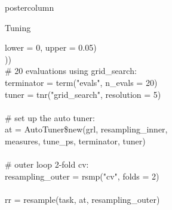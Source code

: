 \documentclass{beamer}
\begin{document}
\begin{frame}[fragile]{}
\begin{columns}
\begin{column}{.245\textwidth}
\begin{beamercolorbox}[center]{postercolumn}
\begin{minipage}{.98\textwidth}
{\begin{myblock}{Tuning}
\begin{codeboxexample}
{                \hspace*{2ex} lower = 0, upper = 0.05)\\
                ))\\
                \# 20 evaluations using grid\_search:\\
                terminator = term("evals", n\_evals = 20)\\
                tuner = tnr("grid\_search", resolution = 5)\\
                \ \\
                \# set up the auto tuner:\\
                at = AutoTuner\$new(grl, resampling\_inner,\\
                \hspace*{1ex} measures, tune\_ps, terminator, tuner)\\
                \ \\
                \# outer loop 2-fold cv:\\
                resampling\_outer = rsmp("cv", folds = 2)\\
                \ \\
                rr = resample(task, at, resampling\_outer)}
					    \end{codeboxexample}
            \end{myblock}
						\vfill}
				\end{minipage}
			\end{beamercolorbox}
		\end{column}
	\end{columns}
\end{frame}
\end{document}
